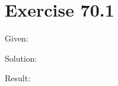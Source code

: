 \documentclass[a4paper, 10pt]{scrartcl}
\begin{document}
\section{Exercise 70.1}

Given:

Solution:

Result:
\end{document}
